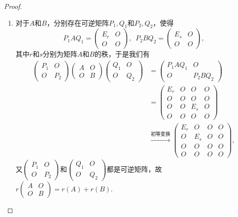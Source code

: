 \begin{enumerate}
    \begin{proof}
    \begin{enumerate}
        \item 对于$A$和$B$，分别存在可逆矩阵$P_1,Q_1$和$P_2,Q_2$，使得
        \[P_1AQ_1=\begin{pmatrix}
                E_r & O \\ O & O
            \end{pmatrix},\enspace P_2BQ_2=\begin{pmatrix}
                E_s & O \\ O & O
            \end{pmatrix},\]
        其中$r$和$s$分别为矩阵$A$和$B$的秩，于是我们有
        \begin{align*}
            \begin{pmatrix}
                P_1 & O \\ O & P_2
            \end{pmatrix}\begin{pmatrix}
                A & O \\ O & B
            \end{pmatrix}\begin{pmatrix}
                Q_1 & O \\ O & Q_2
            \end{pmatrix}&=\begin{pmatrix}
                P_1AQ_1 & O \\ O & P_2BQ_2
            \end{pmatrix}\\
            &=\begin{pmatrix}
                E_r & O & O & O \\ O & O & O & O \\ O & O & E_s & O \\ O & O & O & O
            \end{pmatrix}\\&\xrightarrow{\text{初等变换}}\begin{pmatrix}
                E_r & O & O & O \\ O & E_s & O & O \\ O & O & O & O \\ O & O & O & O
            \end{pmatrix},
        \end{align*}
        又$\begin{pmatrix}
                P_1 & O \\ O & P_2
            \end{pmatrix}$和$\begin{pmatrix}
                Q_1 & O \\ O & Q_2
            \end{pmatrix}$都是可逆矩阵，故$r\begin{pmatrix}
                A & O \\ O & B
            \end{pmatrix}=r(A)+r(B)$.


\end{enumerate}
\end{proof}
\end{enumerate}
